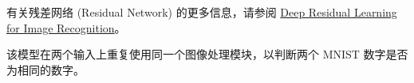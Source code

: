 \label{ux5377ux79efux5c42ux4e0aux7684ux6b8bux5deeux8fdeux63a5}

有关残差网络 (Residual Network) 的更多信息，请参阅
\href{http://arxiv.org/abs/1512.03385}{Deep Residual Learning for Image
Recognition}。

\begin{Shaded}
\begin{Highlighting}[]
  

\OperatorTok{=} \OperatorTok{=}\NormalTok{(}\NormalTok{, }\NormalTok{, }\NormalTok{))}
\OperatorTok{=} \NormalTok{, (}\NormalTok{, }\OperatorTok{=}
\OperatorTok{=} 
\end{Highlighting}
\end{Shaded}

\label{ux5171ux4eabux89c6ux89c9ux6a21ux578b}

该模型在两个输入上重复使用同一个图像处理模块，以判断两个 MNIST
数字是否为相同的数字。

